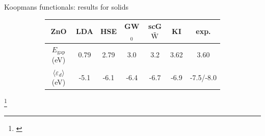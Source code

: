 \documentclass[xcolor=table,aspectratio=169]{beamer}
\newcommand\blfootcite[1]{%
  \begingroup
  \renewcommand\thefootnote{}\footnote{\hspace{-4ex}\cite{#1}}%
  \addtocounter{footnote}{-1}%
  \endgroup
}
\numberwithin{equation}{section}
\begin{document}
\begin{frame}{Koopmans functionals: results for solids}
\begin{figure}[t]
\begin{subfigure}{0.3\textwidth}
      \end{subfigure}
      \begin{subfigure}{\textwidth} %
         \begin{tabularx}{\columnwidth}{C C C C C C C}
            ZnO                                  & LDA  & HSE  & GW$_0$ & scG$\tilde{\rm W}$ & KI   & exp.      \\
            \hline
            $E_\mathrm{gap}$ (eV)                & 0.79 & 2.79 & 3.0    & 3.2                & 3.62 & 3.60      \\
            $\langle \varepsilon_d \rangle$ (eV) & -5.1 & -6.1 & -6.4   & -6.7               & -6.9 & -7.5/-8.0 \\
         \end{tabularx}
      \end{subfigure}
   \end{figure}
   \blfootcite{Colonna2022}
\end{frame}
\end{document}
